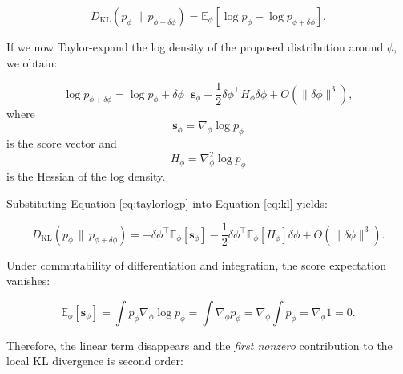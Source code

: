 \begin{equation}
    D_{\mathrm{KL}}
    \left(
        p_\phi
        \,\|\, 
        p_{\phi + \delta \phi}
    \right)
    =
    \mathbb{E}_\phi
    \left[
        \log p_\phi
        -
        \log p_{\phi + \delta \phi}
    \right].
    \label{eq:kl}
\end{equation}

If we now Taylor-expand the log density of the proposed distribution around $\phi$, we obtain:

\begin{equation}
    \log p_{\phi + \delta \phi}
    =
    \log p_\phi
    +
    \delta \phi^\top \mathbf{s}_\phi
    +
    \frac{1}{2}
    \delta \phi^\top
    H_\phi
    \delta \phi
    +
    O(\|\delta \phi\|^3),
    \label{eq:taylorlogp}
\end{equation}
%
where
%
\begin{equation}
    \mathbf{s}_\phi
    =
    \nabla_\phi \log p_\phi
    \label{eq:score}
\end{equation}
%
is the score vector and
%
\begin{equation}
    H_\phi
    =
    \nabla_\phi^2 \log p_\phi
    \label{eq:hessian}
\end{equation}
%
is the Hessian of the log density.

Substituting Equation \eqref{eq:taylorlogp} into Equation \eqref{eq:kl} yields:

\begin{equation}
    D_{\mathrm{KL}}
    \left(
        p_\phi
        \,\|\, 
        p_{\phi + \delta \phi}
    \right)
    =
    -
    \delta \phi^\top
    \mathbb{E}_\phi[\mathbf{s}_\phi]
    -
    \frac{1}{2}
    \delta \phi^\top
    \mathbb{E}_\phi[H_\phi]
    \delta \phi
    +
    O(\|\delta \phi\|^3).
    \label{eq:kltaylor}
\end{equation}

Under commutability of differentiation and integration, the score expectation vanishes:

\begin{equation}
    \mathbb{E}_\phi[\mathbf{s}_\phi]
    =
    \int p_\phi
    \nabla_\phi \log p_\phi
    =
    \int \nabla_\phi p_\phi
    =
    \nabla_\phi \int p_\phi
    =
    \nabla_\phi 1
    =
    0.
    \label{eq:scorezero}
\end{equation}

Therefore, the linear term disappears and the \emph{first nonzero} contribution to the local KL divergence is second order:

